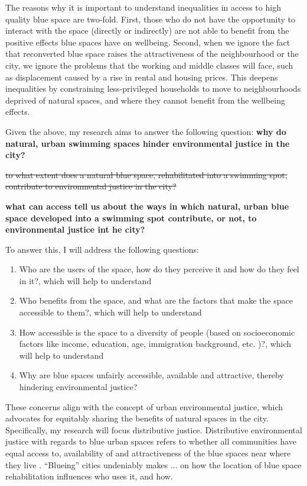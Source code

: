 \documentclass{article}
\begin{document}
The reasons why it is important to understand inequalities in access to high quality blue space are two-fold. 
First, those who do not have the opportunity to interact with the space (directly or indirectly) are not able to benefit from the positive effects blue spaces have on wellbeing. %
Second, when we ignore the fact that reconverted blue space raises the attractiveness of the neighbourhood or the city, we ignore the problems that the working and middle classes will face, such as displacement caused by a rise in rental and housing prices. This deepens inequalities by constraining less-privileged households to move to neighbourhoods deprived of natural spaces, and where they cannot benefit from the wellbeing effects.

Given the above, my research aims to answer the following question: \textbf{why do natural, urban swimming spaces hinder environmental justice in the city?}

\sout{to what extent does a natural blue space, rehabilitated into a swimming spot, contribute to environmental justice in the city?}

\textbf{what can access tell us about the ways in which natural, urban blue space developed into a swimming spot contribute, or not, to environmental justice int he city?}

To answer this, I will address the following questions:

\begin{enumerate}
	\item Who are the users of the space, how do they perceive it and how do they feel in it?, which will help to understand
	\item Who benefits from the space, and what are the factors that make the space accessible to them?, which will help to understand
	\item How accessible is the space to a diversity of people (based on socioeconomic factors like income, education, age, immigration background, etc. \parencite{baro2021school})?, which will help to understand
	\item Why are blue spaces unfairly accessible, available and attractive, thereby hindering environmental justice?
\end{enumerate}


These concerns align with the concept of urban environmental justice, which advocates for equitably sharing the benefits of natural spaces  in the city. Specifically, my research will focus distributive justice. Distributive environmental justice with regards to blue urban spaces refers to whether all communities have equal access to, availability of and attractiveness of the blue spaces near where they live \parencite{kronenberg2020environmental}. 
``Blueing'' cities undeniably makes ...
 on how the location of blue space rehabilitation influences who uses it, and how.
 
\end{document}

